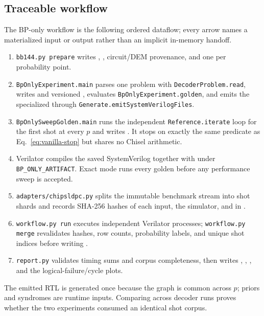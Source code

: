 \documentclass[10pt,conference]{IEEEtran}
\begin{document}
\subsection{Traceable workflow}
The BP-only workflow is the following ordered dataflow; every arrow names a
materialized input or output rather than an implicit in-memory handoff.
\begin{enumerate}
  \item \texttt{bb144.py prepare} writes ,
        , circuit/DEM provenance, and one
         per probability point.
  \item \texttt{BpOnlyExperiment.main} parses one problem with
        \texttt{DecoderProblem.read}, writes  and
        versioned , evaluates
        \texttt{BpOnlyExperiment.golden}, and emits the specialized
         through
        \texttt{Generate.emitSystemVerilogFiles}.
  \item \texttt{BpOnlySweepGolden.main} runs the independent
        \texttt{Reference.iterate} loop for the first shot at every $p$ and
        writes .  It stops on exactly the same
        predicate as Eq.~\eqref{eq:vanilla-stop} but shares no Chisel arithmetic.
  \item Verilator compiles the saved SystemVerilog together with
         under
        \texttt{BP\_ONLY\_ARTIFACT}.  Exact mode runs every golden before any
        performance sweep is accepted.
  \item \texttt{adapters/chipsldpc.py} splits the immutable benchmark stream
        into shot shards and records SHA-256 hashes of each input, the simulator,
        and  in .
  \item \texttt{workflow.py run} executes independent Verilator processes;
        \texttt{workflow.py merge} revalidates hashes, row counts, probability
        labels, and unique shot indices before writing .
  \item \texttt{report.py} validates timing sums and corpus completeness, then
        writes , ,
        , and the logical-failure/cycle plots.
\end{enumerate}
The emitted RTL is generated once because the graph is common across $p$;
priors and syndromes are runtime inputs.  Comparing
 across decoder runs proves whether the two
experiments consumed an identical shot corpus.
\end{document}
